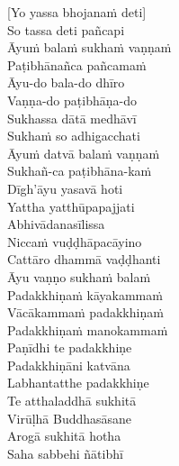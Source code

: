 [Yo yassa bhojanaṁ deti]\\
So tassa deti pañcapi\\
Āyuṁ balaṁ sukhaṁ vaṇṇaṁ\\
Paṭibhānañca pañcamaṁ\hyperlink{endnote119-appendix}{\hypertarget{endnote119-body}{}}\\
Āyu-do bala-do dhīro\\
Vaṇṇa-do paṭibhāṇa-do\\
Sukhassa dātā medhāvī\\
Sukhaṁ so adhigacchati\\
Āyuṁ datvā balaṁ vaṇṇaṁ\\
Sukhañ-ca paṭibhāna-kaṁ\hyperlink{endnote120-appendix}{\hypertarget{endnote120-body}{}}\\
Dīgh'āyu yasavā hoti\\
Yattha yatthūpapajjati\\
Abhivādanasīlissa\\
Niccaṁ vuḍḍhāpacāyino\\
Cattāro dhammā vaḍḍhanti\\
Āyu vaṇṇo sukhaṁ balaṁ\\
Padakkhiṇaṁ kāyakammaṁ\\
Vācākammaṁ padakkhiṇaṁ\\
Padakkhiṇaṁ manokammaṁ\\
Paṇīdhi te padakkhiṇe\\
Padakkhiṇāni katvāna\\
Labhantatthe padakkhiṇe\\
Te atthaladdhā sukhitā\\
Virūḷhā Buddhasāsane\\
Arogā sukhitā hotha\\
Saha sabbehi ñātibhī

